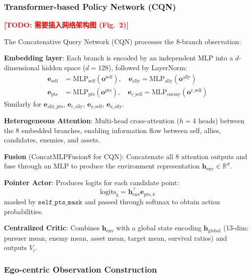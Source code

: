 \documentclass[10pt,conference]{IEEEtran}
\newcommand{\marktodo}[1]{\textcolor{red}{\textbf{[TODO: #1]}}}
\begin{document}
\subsubsection{Transformer-based Policy Network (CQN)}

\marktodo{需要插入网络架构图 (Fig.~2)}

The Concatenative Query Network (CQN) processes the 8-branch observation:

\textbf{Embedding layer}: Each branch is encoded by an independent MLP into a $d$-dimensional hidden space ($d=128$), followed by LayerNorm:
\begin{align}
    \mathbf{e}_{\text{self}} &= \text{MLP}_{\text{self}}(\mathbf{o}^{\text{self}}), \quad \mathbf{e}_{\text{ally}} = \text{MLP}_{\text{ally}}(\mathbf{o}^{\text{ally}}) \\
    \mathbf{e}_{\text{pts}} &= \text{MLP}_{\text{pts}}(\mathbf{o}^{\text{pts}}), \quad \mathbf{e}_{e\_\text{self}} = \text{MLP}_{\text{enemy}}(\mathbf{o}^{e\_\text{self}})
\end{align}
Similarly for $\mathbf{e}_{\text{ally\_pts}}$, $\mathbf{e}_{e\_\text{ally}}$, $\mathbf{e}_{a\_\text{self}}$, $\mathbf{e}_{a\_\text{ally}}$.

\textbf{Heterogeneous Attention}: Multi-head cross-attention ($h=4$ heads) between the 8 embedded branches, enabling information flow between self, allies, candidates, enemies, and assets.

\textbf{Fusion} (ConcatMLPFusion8 for CQN): Concatenate all 8 attention outputs and fuse through an MLP to produce the environment representation $\mathbf{h}_{\text{env}} \in \mathbb{R}^d$.

\textbf{Pointer Actor}: Produces logits for each candidate point:
\begin{equation}
    \text{logits}_k = \mathbf{h}_{\text{env}}^\top \mathbf{e}_{\text{pts},k}
\end{equation}
masked by $\texttt{self\_pts\_mask}$ and passed through softmax to obtain action probabilities.

\textbf{Centralized Critic}: Combines $\mathbf{h}_{\text{env}}$ with a global state encoding $\mathbf{h}_{\text{global}}$ (13-dim: pursuer mean, enemy mean, asset mean, target mean, survival ratios) and outputs $V_i$.

\subsubsection{Ego-centric Observation Construction}
\end{document}
